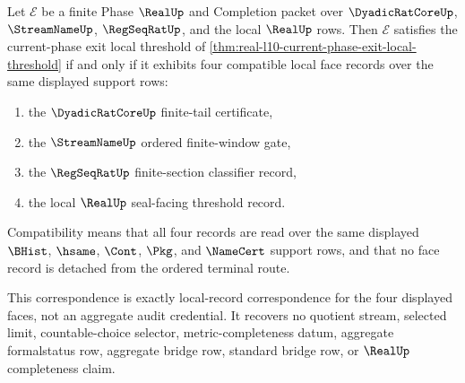 \begin{theorem}
\label{thm:real-l10-exit-threshold-face-local-correspondence}
Let $\mathcal E$ be a finite Phase $\RealUp$ and Completion packet over $\DyadicRatCoreUp$, $\StreamNameUp$, $\RegSeqRatUp$, and the local $\RealUp$ rows. Then $\mathcal E$ satisfies the current-phase exit local threshold of \autoref{thm:real-l10-current-phase-exit-local-threshold} if and only if it exhibits four compatible local face records over the same displayed support rows:
\begin{enumerate}
\item the $\DyadicRatCoreUp$ finite-tail certificate,
\item the $\StreamNameUp$ ordered finite-window gate,
\item the $\RegSeqRatUp$ finite-section classifier record,
\item the local $\RealUp$ seal-facing threshold record.
\end{enumerate}
Compatibility means that all four records are read over the same displayed $\BHist$, $\hsame$, $\Cont$, $\Pkg$, and $\NameCert$ support rows, and that no face record is detached from the ordered terminal route.

This correspondence is exactly local-record correspondence for the four displayed faces, not an aggregate audit credential. It recovers no quotient stream, selected limit, countable-choice selector, metric-completeness datum, aggregate formalstatus row, aggregate bridge row, standard bridge row, or $\RealUp$ completeness claim.
\end{theorem}
